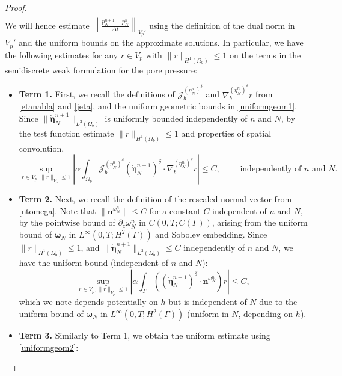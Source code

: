 \documentclass[11pt]{article}
\newcommand{\bd}{\boldsymbol}
\theoremstyle{definition}
\begin{document}
\begin{proof}
\begin{multline*}
\end{multline*}
We will hence estimate $\displaystyle \left\|\frac{p^{n + 1}_{N} - p^{n}_{N}}{\Delta t}\right\|_{V_{p}'}$ using the definition of the dual norm in $V_{p}'$ and the uniform bounds on the approximate solutions. In particular, we have the following estimates for any $r \in V_{p}$ with $\|r\|_{H^{1}(\Omega_{b})} \le 1$ on the terms in the semidiscrete weak formulation for the pore pressure:
\begin{itemize}
\item \textbf{Term 1.} First, we recall the definitions of $\mathcal{J}^{(\eta^{n}_{N})^{\delta}}_{b}$ and $\nabla^{(\eta^{n}_{N})^{\delta}}_{b} r$ from \eqref{etanabla} and \eqref{jeta}, and the uniform geometric bounds in \eqref{uniformgeom1}. Since $\|\dot{\bd{\eta}}^{n + 1}_{N}\|_{L^{2}(\Omega_{b})}$ is uniformly bounded independently of $n$ and $N$, by the test function estimate $\|r\|_{H^{1}(\Omega_{b})} \le 1$ and properties of spatial convolution,
\begin{equation*}
\sup_{r \in V_{p}, \|r\|_{V_{p}} \le 1} \left|\alpha \int_{\Omega_{b}} \mathcal{J}^{(\eta^{n}_{N})^{\delta}}_{b} (\dot{\bd{\eta}}^{n + 1}_{N})^{\delta} \cdot \nabla^{(\eta^{n}_{N})^{\delta}}_{b} r \right| \le C, \qquad \text{ independently of $n$ and $N$}.
\end{equation*}
\item \textbf{Term 2.} Next, we recall the definition of the rescaled normal vector from \eqref{ntomega}. Note that $\|\bd{n}^{\omega^{n}_{N}}\| \le C$ for a constant $C$ independent of $n$ and $N$, by the pointwise bound of $\partial_{z}\omega^{n}_{N}$ in $C(0, T; C(\Gamma))$, arising from the uniform bound of $\bd{\omega}_{N}$ in $L^{\infty}(0, T; H^{2}(\Gamma))$ and Sobolev embedding. Since $\|r\|_{H^{1}(\Omega_{b})} \le 1$, and $\|\dot{\bd{\eta}}^{n + 1}_{N}\|_{L^{2}(\Omega_{b})} \le C$ independently of $n$ and $N$, we have the uniform bound (independent of $n$ and $N$):
\begin{equation*}
\sup_{r \in V_{p}, \|r\|_{V_{p}} \le 1} \left|\alpha \int_{\Gamma} \left(\left(\dot{\bd{\eta}}^{n + 1}_{N}\right)^{\delta} \cdot \bd{n}^{\omega^{n}_{N}}\right) r\right| \le C,
\end{equation*}
which we note depends potentially on $h$ but is independent of $N$ due to the uniform bound of $\bd{\omega}_{N}$ in $L^{\infty}(0, T; H^{2}(\Gamma))$ (uniform in $N$, depending on $h$).  
\item \textbf{Term 3.} Similarly to Term 1, we obtain the uniform estimate using \eqref{uniformgeom2}:

\end{itemize}
\end{proof}
\end{document}
